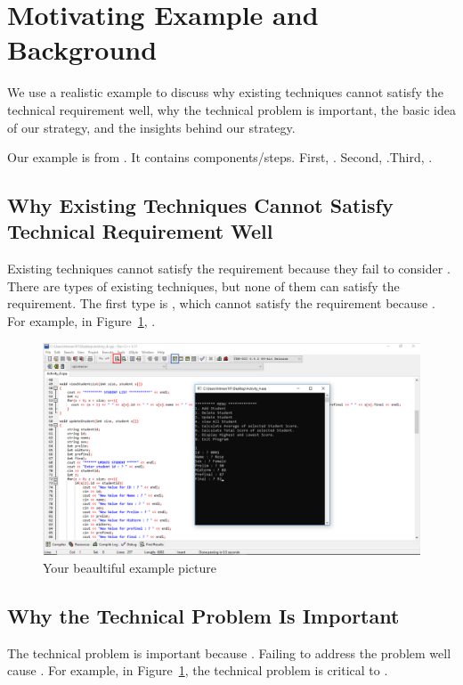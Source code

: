 \section{Motivating Example and Background}

We use a realistic example to discuss 
why existing techniques cannot satisfy the technical requirement well, why the technical problem is important, the basic idea of our strategy, and the insights behind our strategy.

Our example is from . It contains \blank{} components/steps. First, . Second, .Third, .

\subsection{Why Existing Techniques Cannot Satisfy Technical Requirement Well}
Existing techniques cannot satisfy the requirement because they fail to consider \blank{}. There are \blank{} types of existing techniques, but none of them can satisfy the requirement.  The first type is \blank{}, which cannot satisfy the requirement because \blank{}. For example, in Figure~\ref{fig:example}, . 

\begin{figure}[t!]
    \centering
    \includegraphics[width=\textwidth]{fig/example.png}
	\caption{Your beaultiful example picture}
	\label{fig:example}
\end{figure}
\subsection{Why the Technical Problem Is Important}
The technical problem is important because \blank{}. Failing to address the problem well cause \blank{}.  For example, in Figure~\ref{fig:example}, the technical problem is critical to .

